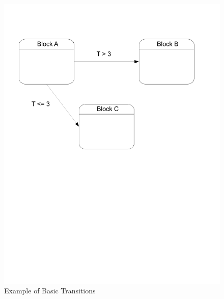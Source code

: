 \begin{figure}[htp]
    \centering
    \includegraphics[trim= 10mm 130mm 20mm 10mm, clip, width=\imgmedium]{./images/state_transition.pdf}
    \caption{Example of Basic Transitions}
    \label{fig:state_transition}
\end{figure}




